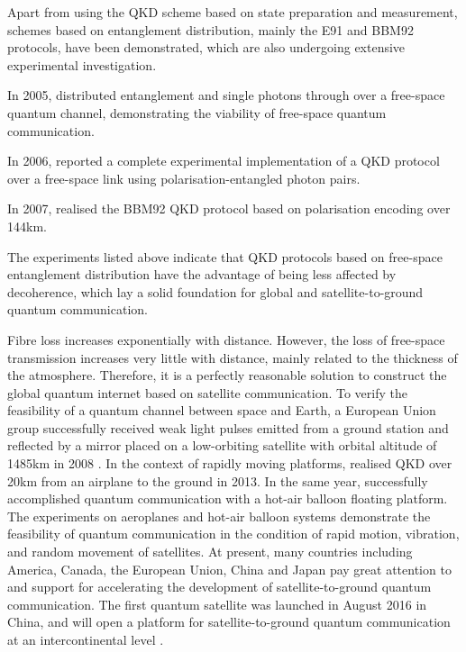\documentclass[aps, rmp, twocolumn, amsmath, amssymb, nofootinbib, superscriptaddress, longbibliography, floatfix, table-of-contents, eqsecnum]{revtex4-1}
\begin{document}
Apart from using the QKD scheme based on state preparation and measurement, schemes based on entanglement distribution, mainly the E91 \cite{bib:PRL_67_661} and BBM92 \cite{bib:PRL_68_557} protocols, have been demonstrated, which are also undergoing extensive experimental investigation.

In 2005, \cite{bib:OE_13_202} distributed entanglement and single photons through over a free-space quantum channel, demonstrating the viability of free-space quantum communication. 

In 2006, \cite{bib:APL_89_101122} reported a complete experimental implementation of a QKD protocol over a free-space link using polarisation-entangled photon pairs.

In 2007, \cite{bib:NP_3_481} realised the BBM92 QKD protocol based on polarisation encoding over 144km.

The experiments listed above indicate that QKD protocols based on free-space entanglement distribution have the advantage of being less affected by decoherence, which lay a solid foundation for global and satellite-to-ground quantum communication.

Fibre loss increases exponentially with distance. However, the loss of free-space transmission increases very little with distance,  mainly related to the thickness of the atmosphere. Therefore, it is a perfectly reasonable solution to construct the global quantum internet based on satellite communication. To verify the feasibility of a quantum channel between space and Earth, a European Union group successfully received weak light pulses emitted from a ground station and reflected by a mirror placed on a low-orbiting satellite with orbital altitude of 1485km in 2008 \cite{bib:NJP_10_033038}. In the context of rapidly moving platforms, \cite{bib:NP_7_382} realised QKD over 20km from an airplane to the ground in 2013. In the same year, \cite{bib:NP_7_387} successfully accomplished quantum communication with a hot-air balloon floating platform. The experiments on aeroplanes and hot-air balloon systems demonstrate the feasibility of quantum communication in the condition of rapid motion, vibration, and random movement of satellites. At present, many countries including America, Canada, the European Union, China and Japan pay great attention to and support for accelerating the development of satellite-to-ground quantum communication. The first quantum satellite was launched in August 2016 in China, and will open a platform for satellite-to-ground quantum communication at an intercontinental level \cite{bib:N_535_478}.
\end{document}
